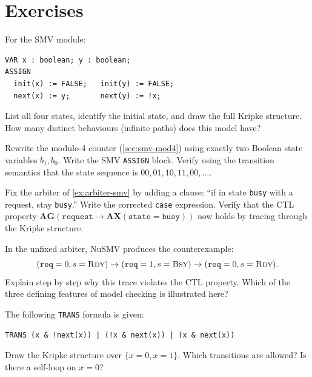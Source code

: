 \section*{Exercises}

\begin{chapex}
For the SMV module:
\begin{verbatim}
VAR x : boolean; y : boolean;
ASSIGN
  init(x) := FALSE;   init(y) := FALSE;
  next(x) := y;       next(y) := !x;
\end{verbatim}
List all four states, identify the initial state, and draw the full
Kripke structure.  How many distinct behaviours (infinite paths)
does this model have?
\end{chapex}

\begin{chapex}
Rewrite the modulo-4 counter (\cref{sec:smv-mod4}) using
exactly two Boolean state variables $b_1, b_0$.  Write the SMV
\texttt{ASSIGN} block.  Verify using the transition semantics that
the state sequence is $00, 01, 10, 11, 00, \ldots$.
\end{chapex}

\begin{chapex}
Fix the arbiter of \cref{ex:arbiter-smv} by adding a clause:
``if in state \texttt{busy} with a request, stay \texttt{busy}.''
Write the corrected \texttt{case} expression.  Verify that the CTL
property $\mathbf{AG}(\texttt{request} \to \mathbf{AX}(\texttt{state}
= \texttt{busy}))$ now holds by tracing through the Kripke structure.
\end{chapex}

\begin{chapex}
In the unfixed arbiter, NuSMV produces the counterexample:
\[
  (\texttt{req}=0, s=\textsc{Rdy}) \to
  (\texttt{req}=1, s=\textsc{Bsy}) \to
  (\texttt{req}=0, s=\textsc{Rdy}).
\]
Explain step by step why this trace violates the CTL property.
Which of the three defining features of model checking is illustrated here?
\end{chapex}

\begin{chapex}
The following \texttt{TRANS} formula is given:
\begin{verbatim}
TRANS (x & !next(x)) | (!x & next(x)) | (x & next(x))
\end{verbatim}
Draw the Kripke structure over $\{x=0, x=1\}$.  Which transitions
are allowed?  Is there a self-loop on $x=0$?
\end{chapex}

